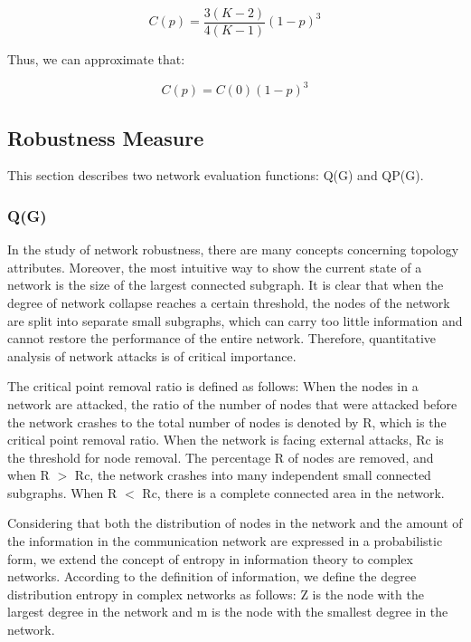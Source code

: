 \documentclass[AMA,STIX1COL]{WileyNJD-v2}
\begin{document}
\begin{equation} 
C\left ( p \right ) = \frac{3\left(K-2 \right )}{4\left (K-1  \right )}\left (1-p  \right )^{3}
\end{equation}

Thus, we can approximate that:

\begin{equation} 
C\left ( p \right ) = C\left ( 0 \right )  \left (1-p  \right )^{3}
\end{equation}

\subsection{Robustness Measure}
\par This section describes two network evaluation functions: Q(G) and QP(G).
\subsubsection{Q(G)}

\par In the study of network robustness, there are many concepts concerning topology attributes. Moreover, the most intuitive way to show the current state of a network is the size of the largest connected subgraph. It is clear that when the degree of network collapse reaches a certain threshold, the nodes of the network are split into separate small subgraphs, which can carry too little information and cannot restore the performance of the entire network. Therefore, quantitative analysis of network attacks is of critical importance. 
\par The critical point removal ratio is defined as follows: When the nodes in a network are attacked, the ratio of the number of nodes that were attacked before the network crashes to the total number of nodes is denoted by R, which is the critical point removal ratio. When the network is facing external attacks, Rc is the threshold for node removal. The percentage R of nodes are removed, and when R $>$ Rc, the network crashes into many independent small connected subgraphs. When R $<$ Rc, there is a complete connected area in the network.

\par Considering that both the distribution of nodes in the network and the amount of the information in the communication network are expressed in a probabilistic form, we extend the concept of entropy in information theory to complex networks. According to the definition of information, we define the degree distribution entropy in complex networks as follows: Z is the node with the largest degree in the network and m is the node with the smallest degree in the network. 
\end{document}
